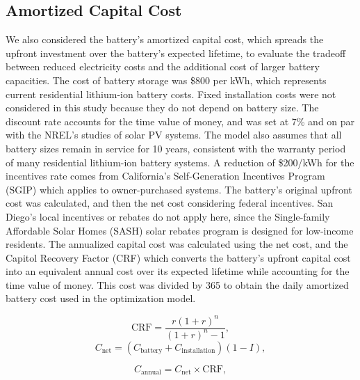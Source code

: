\documentclass[14pt, final,numbered]{ifacconf}
\begin{document}
\subsection{Amortized Capital Cost}
We also considered the battery's amortized capital cost, which spreads the upfront investment over the battery's expected lifetime, to evaluate the tradeoff between reduced electricity costs and the additional cost of larger battery capacities. The cost of battery storage was \$800 per kWh, which represents current residential lithium-ion battery costs. Fixed installation costs were not considered in this study because they do not depend on battery size. The discount rate accounts for the time value of money, and was set at 7\% and on par with the NREL's studies of solar PV systems. The model also assumes that all battery sizes remain in service for 10 years, consistent with the warranty period of many residential lithium-ion battery systems. A reduction of \$200/kWh for the incentives rate comes from California's Self-Generation Incentives Program (SGIP) which applies to owner-purchased systems. The battery's original upfront cost was calculated, and then the net cost considering federal incentives. San Diego's local incentives or rebates do not apply here, since the Single-family Affordable Solar Homes (SASH) solar rebates program is designed for low-income residents. The annualized capital cost was calculated using the net cost, and the Capitol Recovery Factor (CRF) which converts the battery's upfront capital cost into an equivalent annual cost over its expected lifetime while accounting for the time value of money. This cost was divided by 365 to obtain the daily amortized battery cost used in the optimization model.

\begin{equation}
\mathrm{CRF} =
\frac{r(1+r)^n}{(1+r)^n-1},
\end{equation}
\begin{equation}
C_{\mathrm{net}}
=
\left(C_{\mathrm{battery}} + C_{\mathrm{installation}}\right)
(1-I),
\end{equation}

\begin{equation}
C_{\mathrm{annual}}
=
C_{\mathrm{net}}
\times
\mathrm{CRF},
\end{equation}
\end{document}
